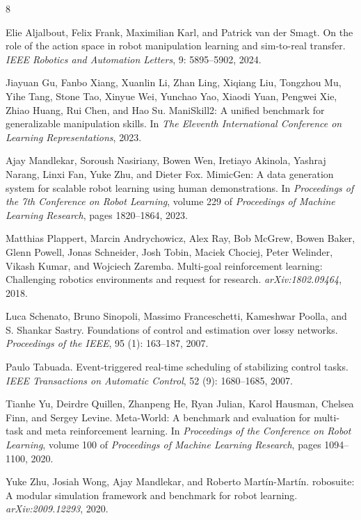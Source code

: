 \begin{thebibliography}{8}

Elie Aljalbout, Felix Frank, Maximilian Karl, and Patrick van der Smagt. On the role of the action space in robot manipulation learning and sim-to-real transfer. \emph{IEEE Robotics and Automation Letters}, 9: 5895--5902, 2024.

Jiayuan Gu, Fanbo Xiang, Xuanlin Li, Zhan Ling, Xiqiang Liu, Tongzhou Mu, Yihe Tang, Stone Tao, Xinyue Wei, Yunchao Yao, Xiaodi Yuan, Pengwei Xie, Zhiao Huang, Rui Chen, and Hao Su. ManiSkill2: A unified benchmark for generalizable manipulation skills. In \emph{The Eleventh International Conference on Learning Representations}, 2023.

Ajay Mandlekar, Soroush Nasiriany, Bowen Wen, Iretiayo Akinola, Yashraj Narang, Linxi Fan, Yuke Zhu, and Dieter Fox. MimicGen: A data generation system for scalable robot learning using human demonstrations. In \emph{Proceedings of the 7th Conference on Robot Learning}, volume 229 of \emph{Proceedings of Machine Learning Research}, pages 1820--1864, 2023.

Matthias Plappert, Marcin Andrychowicz, Alex Ray, Bob McGrew, Bowen Baker, Glenn Powell, Jonas Schneider, Josh Tobin, Maciek Chociej, Peter Welinder, Vikash Kumar, and Wojciech Zaremba. Multi-goal reinforcement learning: Challenging robotics environments and request for research. \emph{arXiv:1802.09464}, 2018.

Luca Schenato, Bruno Sinopoli, Massimo Franceschetti, Kameshwar Poolla, and S. Shankar Sastry. Foundations of control and estimation over lossy networks. \emph{Proceedings of the IEEE}, 95 (1): 163--187, 2007.

Paulo Tabuada. Event-triggered real-time scheduling of stabilizing control tasks. \emph{IEEE Transactions on Automatic Control}, 52 (9): 1680--1685, 2007.

Tianhe Yu, Deirdre Quillen, Zhanpeng He, Ryan Julian, Karol Hausman, Chelsea Finn, and Sergey Levine. Meta-World: A benchmark and evaluation for multi-task and meta reinforcement learning. In \emph{Proceedings of the Conference on Robot Learning}, volume 100 of \emph{Proceedings of Machine Learning Research}, pages 1094--1100, 2020.

Yuke Zhu, Josiah Wong, Ajay Mandlekar, and Roberto Martín-Martín. robosuite: A modular simulation framework and benchmark for robot learning. \emph{arXiv:2009.12293}, 2020.

\end{thebibliography}
